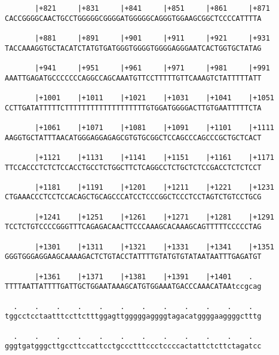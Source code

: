 \documentclass{article}
\begin{document}
\begin{Verbatim}
       |+821     |+831     |+841     |+851     |+861     |+871
CACCGGGGCAACTGCCTGGGGGCGGGGATGGGGGCAGGGTGGAAGCGGCTCCCCATTTTA
                                                            
       |+881     |+891     |+901     |+911     |+921     |+931
TACCAAAGGTGCTACATCTATGTGATGGGTGGGGTGGGGAGGGAATCACTGGTGCTATAG
                                                            
       |+941     |+951     |+961     |+971     |+981     |+991
AAATTGAGATGCCCCCCCAGGCCAGCAAATGTTCCTTTTTGTTCAAAGTCTATTTTTATT
                                                            
       |+1001    |+1011    |+1021    |+1031    |+1041    |+1051
CCTTGATATTTTTCTTTTTTTTTTTTTTTTTTTGTGGATGGGGACTTGTGAATTTTTCTA
                                                            
       |+1061    |+1071    |+1081    |+1091    |+1101    |+1111
AAGGTGCTATTTAACATGGGAGGAGAGCGTGTGCGGCTCCAGCCCAGCCCGCTGCTCACT
                                                            
       |+1121    |+1131    |+1141    |+1151    |+1161    |+1171
TTCCACCCTCTCTCCACCTGCCTCTGGCTTCTCAGGCCTCTGCTCTCCGACCTCTCTCCT
                                                            
       |+1181    |+1191    |+1201    |+1211    |+1221    |+1231
CTGAAACCCTCCTCCACAGCTGCAGCCCATCCTCCCGGCTCCCTCCTAGTCTGTCCTGCG
                                                            
       |+1241    |+1251    |+1261    |+1271    |+1281    |+1291
TCCTCTGTCCCCGGGTTTCAGAGACAACTTCCCAAAGCACAAAGCAGTTTTTCCCCCTAG
                                                            
       |+1301    |+1311    |+1321    |+1331    |+1341    |+1351
GGGTGGGAGGAAGCAAAAGACTCTGTACCTATTTTGTATGTGTATAATAATTTGAGATGT
                                                            
       |+1361    |+1371    |+1381    |+1391    |+1401    .  
TTTTAATTATTTTGATTGCTGGAATAAAGCATGTGGAAATGACCCAAACATAAtccgcag
                                                            
  .    .    .    .    .    .    .    .    .    .    .    .  
tggcctcctaatttccttctttggagttgggggaggggtagacatggggaaggggctttg
                                                            
  .    .    .    .    .    .    .    .    .    .    .    .  
gggtgatgggcttgccttccattcctgccctttccctccccactattctcttctagatcc
                                                            

\end{Verbatim}
\end{document}
